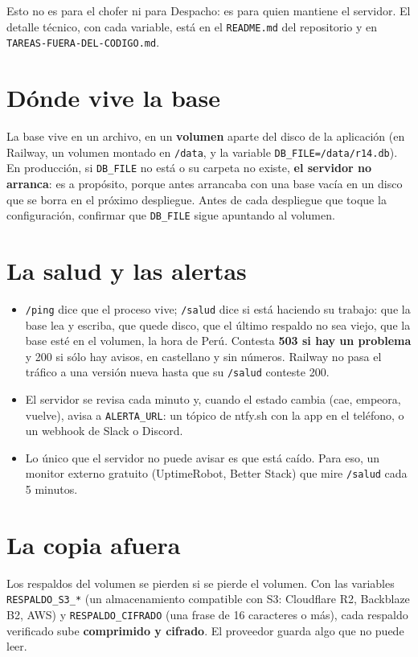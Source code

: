 \documentclass[11pt,a4paper,oneside]{book}
\begin{document}
Esto no es para el chofer ni para Despacho: es para quien mantiene el
servidor. El detalle técnico, con cada variable, está en el \texttt{README.md}
del repositorio y en \texttt{TAREAS-FUERA-DEL-CODIGO.md}.

\section{Dónde vive la base}

La base vive en un archivo, en un \textbf{volumen} aparte del disco de la
aplicación (en Railway, un volumen montado en \texttt{/data}, y la variable
\texttt{DB\_FILE=/data/r14.db}). En producción, si \texttt{DB\_FILE} no está o
su carpeta no existe, \textbf{el servidor no arranca}: es a propósito, porque
antes arrancaba con una base vacía en un disco que se borra en el próximo
despliegue. Antes de cada despliegue que toque la configuración, confirmar que
\texttt{DB\_FILE} sigue apuntando al volumen.

\section{La salud y las alertas}

\begin{itemize}
  \item \texttt{/ping} dice que el proceso vive; \texttt{/salud} dice si está
    haciendo su trabajo: que la base lea y escriba, que quede disco, que el
    último respaldo no sea viejo, que la base esté en el volumen, la hora de
    Perú. Contesta \textbf{503 si hay un problema} y 200 si sólo hay avisos,
    en castellano y sin números. Railway no pasa el tráfico a una versión
    nueva hasta que su \texttt{/salud} conteste 200.
  \item El servidor se revisa cada minuto y, cuando el estado cambia (cae,
    empeora, vuelve), avisa a \texttt{ALERTA\_URL}: un tópico de ntfy.sh con la
    app en el teléfono, o un webhook de Slack o Discord.
  \item Lo único que el servidor no puede avisar es que está caído. Para eso,
    un monitor externo gratuito (UptimeRobot, Better Stack) que mire
    \texttt{/salud} cada 5 minutos.
\end{itemize}

\section{La copia afuera}

Los respaldos del volumen se pierden si se pierde el volumen. Con las
variables \texttt{RESPALDO\_S3\_*} (un almacenamiento compatible con S3:
Cloudflare R2, Backblaze B2, AWS) y \texttt{RESPALDO\_CIFRADO} (una frase de
16 caracteres o más), cada respaldo verificado sube \textbf{comprimido y
cifrado}. El proveedor guarda algo que no puede leer.
\end{document}
